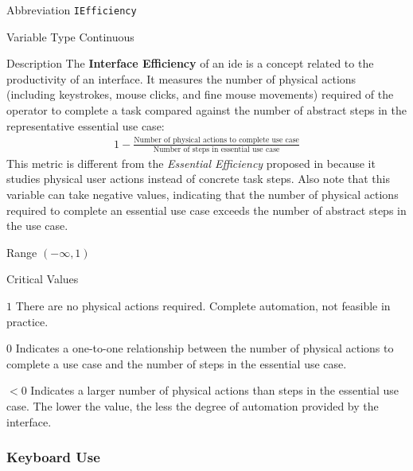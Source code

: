 \begin{AlignedDesc}
  \item[Abbreviation] \texttt{IEfficiency}

  \item[Variable Type] Continuous

  \item[Description] The \textbf{Interface Efficiency} of an \ac{ide} is a
  concept related to the productivity of an interface. It measures the
  number of physical actions (including keystrokes, mouse clicks, and fine
  mouse movements) required of the operator to complete a task compared
  against the number of abstract steps in the representative essential use
  case:
%
  \begin{align*}
    1 - \frac{\text{Number of physical actions to complete use case}}
             {\text{Number of steps in essential use case}}
  \end{align*}
%
  This metric is different from the \textit{Essential Efficiency} proposed
  in \cite{constantine1996} because it studies physical user actions
  instead of concrete task steps. Also note that this variable can take
  negative values, indicating that the number of physical actions required
  to complete an essential use case exceeds the number of abstract steps in
  the use case.

  \item[Range] $(-\infty, 1)$

  \item[Critical Values]
  \begin{AlignedDesc}
    \item[$1$] There are no physical actions required. Complete automation,
    not feasible in practice.
    \item[$0$] Indicates a one-to-one relationship between the number of
    physical actions to complete a use case and the number of steps in the
    essential use case.
    \item[$<0$] Indicates a larger number of physical actions than steps in
    the essential use case. The lower the value, the less the degree of
    automation provided by the interface.
  \end{AlignedDesc}

\end{AlignedDesc}

\subsubsection{Keyboard Use}
\label{subsec:keyboard}

